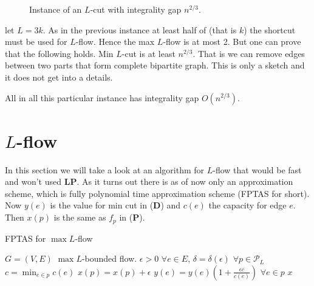\begin{figure}[!ht]
	\caption{Instance of an $L$-cut with integrality gap $n^{2/3}$.}
	\label{huge integrality gap}
\end{figure}

let $L = 3k$. As in the previous instance at least half of (that is $k$) the shortcut must be used for $L$-flow. Hence the max $L$-flow is at most 2. But one can prove that the following holds. Min $L$-cut is at least $n^{2/3}$. That is we can remove edges between two parts that form complete bipartite graph. This is only a sketch and it does not get into a details.

All in all this particular instance has integrality gap $O(n^{2/3})$.

\section{$L$-flow}

In this section we will take a look at an algorithm for $L$-flow that would be fast and won't used \textbf{LP}. As it turns out there is as of now only an approximation scheme, which is fully polynomial time approximation scheme (FPTAS for short). Now $y(e)$ is the value for min cut in (\textbf{D}) and $c(e)$ the capacity for edge $e$. Then $x(p)$ is the same as $f_p$ in (\textbf{P}).

\begin{algorithm}
	\caption{FPTAS for $\max L$-flow}
	\begin{algorithmic}[1]
		\Require $G = (V,E)$
		\Ensure $\max L$-bounded flow.
		\State $\epsilon > 0$ $\forall e \in E$, $\delta = \delta(\epsilon)$ $\forall p \in \mathcal{P}_L$
			\State $c = \min_{e \in p} c(e)$
			\State $x(p) = x(p) + \epsilon$
			\State $y(e) = y(e) \left( 1 + \frac{\epsilon c}{c(e)} \right)$ $\forall e \in p$
		\EndWhile
		\State \Return $x$
	\end{algorithmic}
\end{algorithm}

